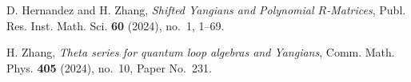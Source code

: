 
D. Hernandez and H. Zhang, \emph{Shifted Yangians and Polynomial $R$-Matrices}, Publ. Res. Inst. Math. Sci. \textbf{60} (2024), no.~1, 1--69.

H. Zhang, \emph{Theta series for quantum loop algebras and Yangians}, Comm. Math. Phys. \textbf{405} (2024), no.~10, Paper No.~231.
